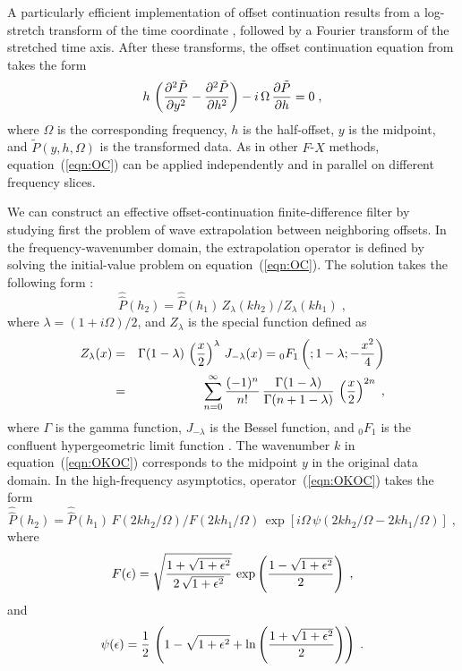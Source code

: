 A particularly efficient implementation of offset continuation results
from a log-stretch transform of the time coordinate
\cite{GPR30.06.08130828}, followed by a Fourier transform of the
stretched time axis. After these transforms, the offset continuation
equation from \cite{ofcon1} takes the form
\begin{equation}
  h \, \left( {\partial^2 \tilde{P} \over \partial y^2} - 
    {\partial^2 \tilde{P} \over \partial h^2} \right) - 
  i\,\Omega \, {\partial \tilde{P} \over   {\partial h}} = 0 \;,
  \label{eqn:OC} 
\end{equation}
where $\Omega$ is the corresponding frequency, $h$ is the half-offset,
$y$ is the midpoint, and $\tilde{P} (y,h,\Omega)$ is the transformed
data. As in other $F$-$X$ methods, equation~(\ref{eqn:OC}) can be
applied independently and in parallel on different frequency slices.
\par
We can construct an effective offset-continuation finite-difference
filter by studying first the problem of wave extrapolation between
neighboring offsets. In the frequency-wavenumber domain, the
extrapolation operator is defined by solving the initial-value problem
on equation~(\ref{eqn:OC}). The solution takes the following form
\cite{ofcon1}:
\begin{equation}
\widehat{\widehat{P}}(h_2) = \widehat{\widehat{P}}(h_1)\,
Z_{\lambda}(kh_2)/Z_{\lambda}(kh_1)\;,
\label{eqn:OKOC}
\end{equation}
where $\lambda = (1 + i \Omega)/2$, and $Z_\lambda$ is the special
function defined as
\begin{eqnarray}
\nonumber
Z_{\lambda}(x) & = & \Gamma(1-\lambda)\,\left(x \over 2\right)^{\lambda}\,
J_{-\lambda}(x)=
{}_0F_1\left(;1-\lambda;-\frac{x^2}{4}\right) \\
& = &
\sum_{n=0}^{\infty} {(-1)^n \over n!}\,
{\Gamma(1-\lambda) \over \Gamma(n+1-\lambda)}\,
\left(x \over 2\right)^{2n}\;,
\label{eqn:z}
\end{eqnarray}
where $\Gamma$ is the gamma function, $J_{-\lambda}$ is the Bessel
function, and ${}_0F_1$ is the confluent hypergeometric limit function
\cite{ab}. The wavenumber $k$ in equation~(\ref{eqn:OKOC}) corresponds
to the midpoint $y$ in the original data domain.  In the
high-frequency asymptotics, operator~(\ref{eqn:OKOC}) takes the form
\begin{equation}
\widehat{\widehat{P}}(h_2) = \widehat{\widehat{P}}(h_1)\,
F(2 k h_2/\Omega)/F(2 k h_1/\Omega)\,
\exp{\left[i\Omega\,\psi\left(2 k h_2/\Omega - 2 k h_1/\Omega\right)\right]}\;,
\label{eqn:AOKOC}
\end{equation}
where
\begin{equation}
F(\epsilon)=\sqrt{{1+\sqrt{1+\epsilon^2}} \over
{2\,\sqrt{1+\epsilon^2}}}\,
\exp\left({1-\sqrt{1+\epsilon^2}} \over 2\right)\;,
\label{eqn:F}
\end{equation}
and
\begin{equation}
\psi(\epsilon)={1 \over 2}\,\left(1 - \sqrt{1+\epsilon^2} +
\ln\left({1 + \sqrt{1+\epsilon^2}} \over 2\right)\right)\;.
\label{eqn:psi}
\end{equation}

